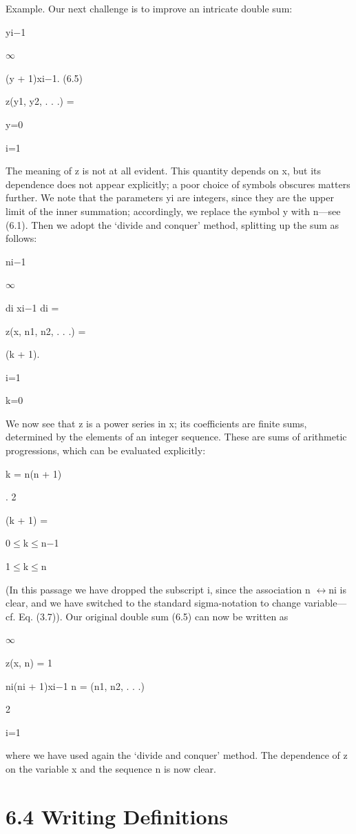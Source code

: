 \documentclass[11pt]{article}
\theoremstyle{plain}
\theoremstyle{definition}
\begin{document}
Example. Our next challenge is to improve an intricate double sum:

yi$-$1

$\infty$

(y + 1)xi$-$1. (6.5)

z(y1, y2, . . .) =

y=0

i=1

The meaning of z is not at all evident. This quantity depends on x, but its dependence does not appear explicitly; a poor choice of symbols obscures matters further. We note that the parameters yi are integers, since they are the upper limit of the inner summation; accordingly, we replace the symbol y with n---see (6.1). Then we adopt the `divide and conquer' method, splitting up the sum as follows:

ni$-$1

$\infty$

di xi$-$1 di =

z(x, n1, n2, . . .) =

(k + 1).

i=1

k=0

We now see that z is a power series in x; its coefficients are finite sums, determined by the elements of an integer sequence. These are sums of arithmetic progressions, which can be evaluated explicitly:

k = n(n + 1)

. 2

(k + 1) =

0$\leq$k$\leq$n$-$1

1$\leq$k$\leq$n

(In this passage we have dropped the subscript i, since the association n $\leftrightarrow$ni is clear, and we have switched to the standard sigma-notation to change variable--- cf. Eq. (3.7)). Our original double sum (6.5) can now be written as

$\infty$

z(x, n) = 1

ni(ni + 1)xi$-$1 n = (n1, n2, . . .)

2

i=1

where we have used again the `divide and conquer' method. The dependence of z on the variable x and the sequence n is now clear.

\section{6.4 Writing Definitions}
\end{document}
